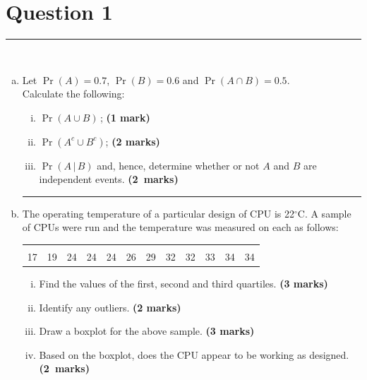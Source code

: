 \documentclass[12pt]{article}
\begin{document}
\section*{Question 1 }
\noindent\rule{\linewidth}{1pt}
\quad\\[-0.5cm]
\begin{enumerate}[a)]
\item Let $\Pr(A) = 0.7$, $\Pr(B)=0.6$ and $\Pr(A\cap B) = 0.5$.\\[0.2cm]
    Calculate the following:
    \begin{enumerate}[i)]\itemsep0.3cm
    \item $\Pr(A\cup B)$\,; \hfill{\scriptsize \bf (1 mark)}
    \item $\Pr(A^c \cup B^c)$; \hfill{\scriptsize \bf (2 marks)}
    \item $\Pr(A\,|\,B)$ and, hence, determine whether or not $A$ and $B$ are independent events. \hfill{\mbox{\scriptsize \bf (2 marks)}}
    \end{enumerate}
    \begin{center}\noindent\rule{0.4\linewidth}{0.5pt}\end{center}
\item The operating temperature of a particular design of CPU is 22$^\circ$C. A sample of CPUs were run and the temperature was measured on each as follows:\\[-0.6cm]
    \begin{center}
    \begin{tabular}{|cccccccccccc|}
    \hline
    &&&&&&&&&&&\\[-0.3cm]
    17 & 19 & 24 & 24 & 24 & 26 & 29 & 32 & 32 & 33 & 34 & 34  \\[0.1cm]
    \hline
    \end{tabular}
    \end{center}
    \begin{enumerate}[i)]\itemsep0.3cm
    \item Find the values of the first, second and third quartiles. \hfill{\scriptsize \bf (3 marks)}
    \item Identify any outliers. \hfill{\scriptsize \bf (2 marks)}
    \item Draw a boxplot for the above sample. \hfill{\scriptsize \bf (3 marks)}
    \item Based on the boxplot, does the CPU appear to be working as designed.\hfill{\mbox{\scriptsize \bf (2 marks)}}    \end{enumerate}

\end{enumerate}
\end{document}
